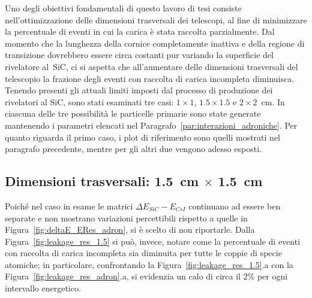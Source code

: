 Uno degli obiettivi fondamentali di questo lavoro di tesi consiste nell'ottimizzazione delle dimensioni trasversali dei telescopi, al fine di minimizzare la percentuale di eventi in cui la carica è stata raccolta parzialmente. 
Dal momento che la lunghezza della cornice completamente inattiva e della regione di transizione dovrebbero essere circa costanti pur variando la superficie del rivelatore al~SiC, ci si aspetta che all'aumentare delle dimensioni trasversali del telescopio la frazione degli eventi con raccolta di carica incompleta diminuisca.
Tenendo presenti gli attuali limiti imposti dal processo di produzione dei rivelatori al SiC, sono stati esaminati tre casi: $1 \times 1$, $1.5 \times 1.5$ e $2 \times 2$~cm. 
In ciascuna delle tre possibilità le particelle primarie sono state generate mantenendo i parametri elencati nel Paragrafo~\ref{par:interazioni_adroniche}.
Per quanto riguarda il primo caso, i plot di riferimento sono quelli mostrati nel paragrafo precedente, mentre per gli altri due vengono adesso esposti.

\subsection*{Dimensioni trasversali: 1.5~cm $\times$ 1.5~cm}




Poiché nel caso in esame le matrici $\Delta E_{SiC} - E_{CsI}$ continuano ad essere ben separate e non mostrano variazioni percettibili rispetto a quelle in Figura~\ref{fig:deltaE_ERes_adron}, si è scelto di non riportarle.
Dalla Figura~\ref{fig:leakage_res_1.5} si può, invece, notare come la percentuale di eventi con raccolta di carica incompleta sia diminuita per tutte le coppie di specie atomiche; in particolare, confrontando la Figura~\ref{fig:leakage_res_1.5}.a con la Figura~\ref{fig:leakage_res_adron}.a, si evidenzia un calo di circa il 2\% per ogni intervallo energetico.

